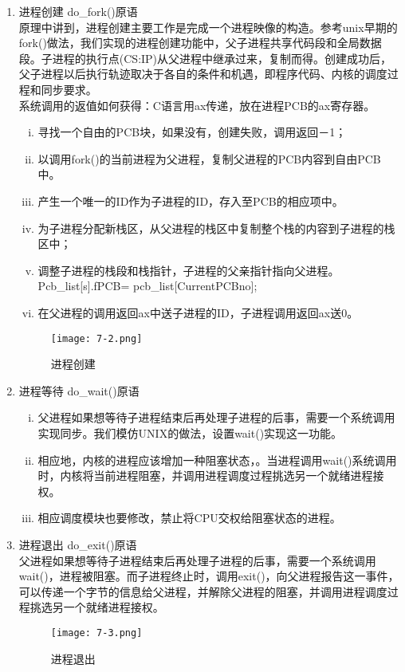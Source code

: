 \documentclass[UTF8]{article}
\begin{document}
{\begin{enumerate}[1)]
		
	\item 进程创建 do\_fork()原语
	\\原理中讲到，进程创建主要工作是完成一个进程映像的构造。参考unix早期的fork()做法，我们实现的进程创建功能中，父子进程共享代码段和全局数据段。子进程的执行点(CS:IP)从父进程中继承过来，复制而得。创建成功后，父子进程以后执行轨迹取决于各自的条件和机遇，即程序代码、内核的调度过程和同步要求。
\\系统调用的返值如何获得：C语言用ax传递，放在进程PCB的ax寄存器。
	\begin{enumerate}[i)]
		\heiti \setlength{\itemsep}{0.2ex}
		\item 寻找一个自由的PCB块，如果没有，创建失败，调用返回－1；
		\item 以调用fork()的当前进程为父进程，复制父进程的PCB内容到自由PCB中。
		\item 产生一个唯一的ID作为子进程的ID，存入至PCB的相应项中。
		\item 为子进程分配新栈区，从父进程的栈区中复制整个栈的内容到子进程的栈区中；
		\item 调整子进程的栈段和栈指针，子进程的父亲指针指向父进程。
Pcb\_list[s].fPCB= pcb\_list[CurrentPCBno];
		\item 在父进程的调用返回ax中送子进程的ID，子进程调用返回ax送0。
		\end{enumerate}
		\begin{figure}[htbp]
			\centering
			\texttt{[image: 7-2.png]}
			\caption{进程创建}
		\end{figure}
		
		\item 进程等待 do\_wait()原语
		\begin{enumerate}[i)]
		\heiti \setlength{\itemsep}{0.2ex}
			\item 父进程如果想等待子进程结束后再处理子进程的后事，需要一个系统调用实现同步。我们模仿UNIX的做法，设置wait()实现这一功能。
			\item 相应地，内核的进程应该增加一种阻塞状态，。当进程调用wait()系统调用时，内核将当前进程阻塞，并调用进程调度过程挑选另一个就绪进程接权。
			\item 相应调度模块也要修改，禁止将CPU交权给阻塞状态的进程。

		\end{enumerate}
		
		\item 进程退出 do\_exit()原语
		\\父进程如果想等待子进程结束后再处理子进程的后事，需要一个系统调用wait()，进程被阻塞。而子进程终止时，调用exit()，向父进程报告这一事件，可以传递一个字节的信息给父进程，并解除父进程的阻塞，并调用进程调度过程挑选另一个就绪进程接权。
		\begin{figure}[htbp]
			\centering
			\texttt{[image: 7-3.png]}
			\caption{进程退出}
		\end{figure}
\end{enumerate}
}
\end{document}

